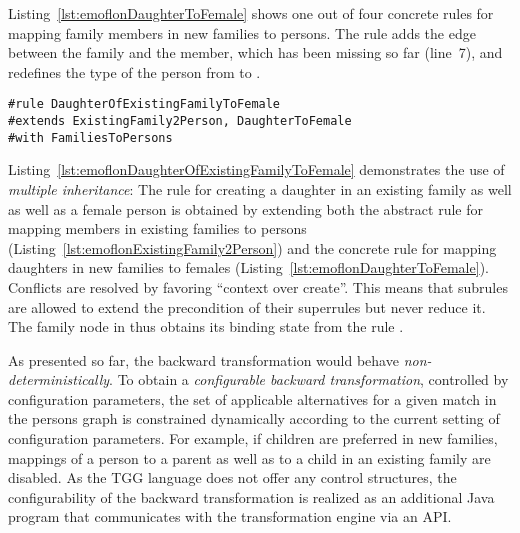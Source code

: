 Listing~\ref{lst:emoflonDaughterToFemale} shows one out of four concrete rules for mapping family members in new families to persons.
The rule adds the edge between the family and the member, which has been missing so far (line~7), and redefines the type of the person from  to .

\begin{lstlisting}[label={lst:emoflonDaughterOfExistingFamilyToFemale}, float=tb!, language=emoflon, caption={Mapping daughters in existing families to females}]
#rule DaughterOfExistingFamilyToFemale
#extends ExistingFamily2Person, DaughterToFemale
#with FamiliesToPersons
\end{lstlisting}

Listing~\ref{lst:emoflonDaughterOfExistingFamilyToFemale} demonstrates the use of \emph{multiple inheritance}: The rule for creating a daughter in an existing family as well as well as a female person is obtained by extending both the abstract rule for mapping members in existing families to persons (Listing~\ref{lst:emoflonExistingFamily2Person}) and the concrete rule for mapping daughters in new families to females (Listing~\ref{lst:emoflonDaughterToFemale}).
Conflicts are resolved by favoring ``context over create''.
This means that subrules are allowed to extend the precondition of their superrules but never reduce it.
The family node  in  thus obtains its binding state from the rule .

As presented so far, the backward transformation would behave \emph{non-deterministically}. To obtain a \emph{configurable backward transformation}, controlled by configuration parameters, the set of applicable alternatives for a given match in the persons graph is constrained dynamically according to the current setting of configuration parameters.
For example, if children are preferred in new families, mappings of a person to a parent as well as to a child in an existing family are disabled.
As the TGG language does not offer any control structures, the configurability of the backward transformation is realized as an additional Java program that communicates with the transformation engine via an API. 

